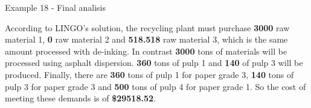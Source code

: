 \begin{frame}{Example 18 - Final analisis}

According to LINGO's solution, the recycling plant must purchase \textbf{3000}
raw material 1, \textbf{0} raw material 2 and \textbf{518.518} raw material 3,
which is the same amount processed with de-inking. In contrast \textbf{3000}
tons of materials will be processed using asphalt dispersion. \textbf{360}
tons of pulp 1 and \textbf{140} of pulp 3 will be produced.
Finally, there are \textbf{360} tons of pulp 1 for paper grade 3, \textbf{140}
tons of pulp 3 for paper grade 3 and \textbf{500} tons of pulp 4 for paper
grade 1. So the cost of meeting these demands is of \textbf{\$29518.52}.

\end{frame}
